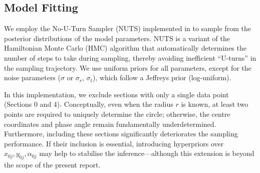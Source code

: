 \documentclass[11pt]{article}
\begin{document}
\subsection{Model Fitting}

We employ the No-U-Turn Sampler (NUTS) implemented in \cite{phan2019composable,bingham2019pyro} to sample from the posterior distributions of the model parameters. NUTS is a variant of the Hamiltonian Monte Carlo (HMC) algorithm that automatically determines the number of steps to take during sampling, thereby avoiding inefficient “U-turns” in the sampling trajectory. We use uniform priors for all parameters, except for the noise parameters ($\sigma$ or $\sigma_r$, $\sigma_t$), which follow a Jeffreys prior (log-uniform).

In this implementation, we exclude sections with only a single data point (Sections 0 and 4). Conceptually, even when the radius $r$ is known, at least two points are required to uniquely determine the circle; otherwise, the centre coordinates and phase angle remain fundamentally underdetermined. Furthermore, including these sections significantly deteriorates the sampling performance. If their inclusion is essential, introducing hyperpriors over ${x_{0j}, y_{0j}, \alpha_{0j}}$ may help to stabilise the inference—although this extension is beyond the scope of the present report.
\end{document}
